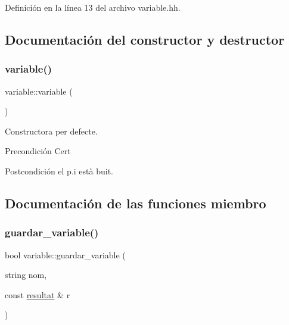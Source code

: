 Definición en la línea 13 del archivo variable.\+hh.



\subsection{Documentación del constructor y destructor}
\hypertarget{classvariable_a424009148a020b406a8a5ecefa854edc}{}\label{classvariable_a424009148a020b406a8a5ecefa854edc} 
\subsubsection{\texorpdfstring{variable()}{variable()}}
{\footnotesize\ttfamily variable\+::variable (\begin{DoxyParamCaption}{ }\end{DoxyParamCaption})}



Constructora per defecte. 

\begin{DoxyPrecond}{Precondición}
Cert 
\end{DoxyPrecond}
\begin{DoxyPostcond}{Postcondición}
el p.\+i està buit. 
\end{DoxyPostcond}


\subsection{Documentación de las funciones miembro}
\hypertarget{classvariable_ac8e2c3022d51e243b4c336c023300d28}{}\label{classvariable_ac8e2c3022d51e243b4c336c023300d28} 
\subsubsection{\texorpdfstring{guardar\+\_\+variable()}{guardar\_variable()}}
{\footnotesize\ttfamily bool variable\+::guardar\+\_\+variable (\begin{DoxyParamCaption}\item[{string}]{nom,  }\item[{const \hyperlink{classresultat}{resultat} \&}]{r }\end{DoxyParamCaption})}



